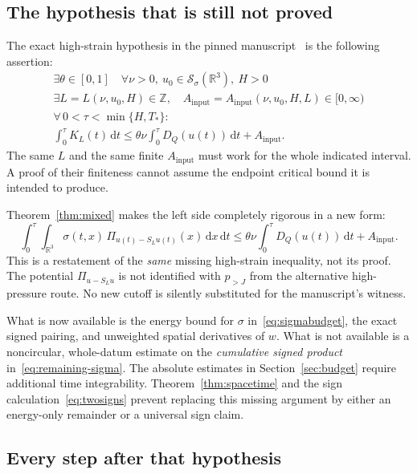 \documentclass[11pt,a4paper]{article}
\theoremstyle{definition}
\newcommand{\R}{\mathbb R}
\newcommand{\Sch}{\mathcal S}
\newcommand{\dd}{\,\mathrm dx}
\newcommand{\dt}{\,\mathrm dt}
\begin{document}
\subsection{The hypothesis that is still not proved}
The exact high-strain hypothesis in the pinned manuscript~\cite{Paper} is the following assertion:
\begin{equation}\label{eq:quantifiers}
 \boxed{\begin{gathered}
 \exists\theta\in[0,1]\quad
 \forall\nu>0,\ u_0\in\Sch_\sigma(\R^3),\ H>0\\
 \exists L=L(\nu,u_0,H)\in\mathbb Z,
 \quad A_{\mathrm{input}}=A_{\mathrm{input}}(\nu,u_0,H,L)\in[0,\infty)\\
 \forall\,0<\tau<\min\{H,T_*\}:\\[-2pt]
 \int_0^\tau K_L(t)\dt
 \le\theta\nu\int_0^\tau D_Q(u(t))\dt+A_{\mathrm{input}}.
 \end{gathered}}
\end{equation}
The same $L$ and the same finite $A_{\mathrm{input}}$ must work for the whole indicated interval. A proof of their finiteness cannot assume the endpoint critical bound it is intended to produce.

Theorem~\ref{thm:mixed} makes the left side completely rigorous in a new form:
\begin{equation}\label{eq:remaining-sigma}
 \boxed{\quad
 \int_0^\tau\int_{\R^3}
 \sigma(t,x)\,\Pi_{u(t)-S_Lu(t)}(x)\dd\dt
 \le\theta\nu\int_0^\tau D_Q(u(t))\dt+A_{\mathrm{input}}.
 \quad}
\end{equation}
This is a restatement of the \emph{same} missing high-strain inequality, not its proof. The potential $\Pi_{u-S_Lu}$ is not identified with $p_{>J}$ from the alternative high-pressure route. No new cutoff is silently substituted for the manuscript's witness.

What is now available is the energy bound for $\sigma$ in~\eqref{eq:sigmabudget}, the exact signed pairing, and unweighted spatial derivatives of $w$. What is not available is a noncircular, whole-datum estimate on the \emph{cumulative signed product} in~\eqref{eq:remaining-sigma}. The absolute estimates in Section~\ref{sec:budget} require additional time integrability. Theorem~\ref{thm:spacetime} and the sign calculation~\eqref{eq:twosigns} prevent replacing this missing argument by either an energy-only remainder or a universal sign claim.

\subsection{Every step after that hypothesis}
\end{document}
